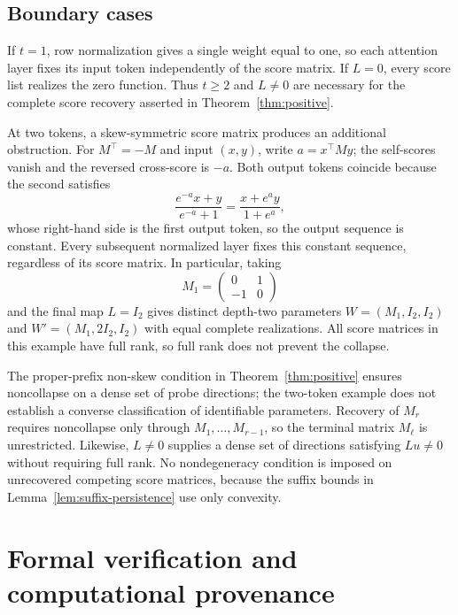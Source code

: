 \documentclass[mlmain]{jmlr}
\begin{document}
\subsection{Boundary cases}
\label{app:boundaries}

If $t=1$, row normalization gives a single weight equal to one, so each
attention layer fixes its input token independently of the score matrix.
If $L=0$, every score list realizes the zero function.  Thus $t\ge2$ and
$L\ne0$ are necessary for the complete score recovery asserted in
Theorem~\ref{thm:positive}.

At two tokens, a skew-symmetric score matrix produces an additional
obstruction.  For $M^\top=-M$ and input $(x,y)$, write $a=x^\top My$;
the self-scores vanish and the reversed cross-score is $-a$.
Both output tokens coincide because the second satisfies
\begin{equation}
 \frac{e^{-a}x+y}{e^{-a}+1}
 =\frac{x+e^a y}{1+e^a},
 \label{eq:skew-two-token-collapse}
\end{equation}
whose right-hand side is the first output token, so the output sequence is
constant.
Every subsequent normalized layer fixes this constant sequence, regardless
of its score matrix.  In particular, taking
\begin{equation}
 M_1=\begin{pmatrix}0&1\\-1&0\end{pmatrix}
 \label{eq:full-rank-skew-example}
\end{equation}
and the final map $L=I_2$ gives distinct depth-two parameters
$W=(M_1,I_2,I_2)$ and $W'=(M_1,2I_2,I_2)$ with equal complete
realizations.  All score matrices in this example have full rank, so full
rank does not prevent the collapse.

The proper-prefix non-skew condition in Theorem~\ref{thm:positive}
ensures noncollapse on a dense set of probe directions; the two-token
example does not establish a converse classification of identifiable
parameters.  Recovery of $M_r$ requires noncollapse only through
$M_1,\ldots,M_{r-1}$, so the terminal matrix $M_\ell$ is unrestricted.
Likewise, $L\ne0$ supplies a dense set of directions satisfying $Lu\ne0$
without requiring full rank.  No nondegeneracy condition is imposed on
unrecovered competing score matrices, because the suffix bounds in
Lemma~\ref{lem:suffix-persistence} use only convexity.


\section{Formal verification and computational provenance}
\label{app:formal-certification}
\end{document}
